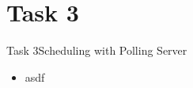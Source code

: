 
\section{Task 3}

\setcounter{task}{1}

\begin{frame}[allowframebreaks]{Task 3}{Scheduling with Polling Server}
  \begin{itemize}
    \item asdf
  \end{itemize}
\end{frame}
